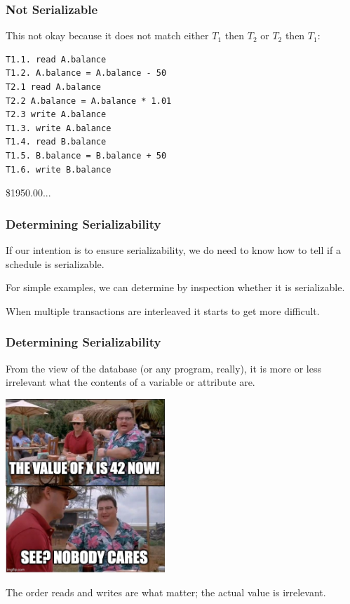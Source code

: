 \begin{frame}[fragile]
\frametitle{Not Serializable}

This not okay because it does not match either $T_{1}$ then $T_{2}$ or $T_{2}$ then $T_{1}$:

\begin{verbatim}
T1.1. read A.balance
T1.2. A.balance = A.balance - 50
T2.1 read A.balance
T2.2 A.balance = A.balance * 1.01
T2.3 write A.balance
T1.3. write A.balance
T1.4. read B.balance
T1.5. B.balance = B.balance + 50
T1.6. write B.balance
\end{verbatim}

\$1950.00...

\end{frame}

\begin{frame}
\frametitle{Determining Serializability}


If our intention is to ensure serializability, we do need to know how to tell if a schedule is serializable. 

For simple examples, we can determine by inspection whether it is serializable.

When multiple transactions are interleaved it starts to get more difficult.

\end{frame}

\begin{frame}
\frametitle{Determining Serializability}


From the view of the database (or any program, really), it is more or less irrelevant what the contents of a variable or attribute are.

\begin{center}
	\includegraphics[width=0.45\textwidth]{images/nobodycares.jpg}
\end{center}

The order reads and writes are what matter; the actual value is irrelevant.

\end{frame}

